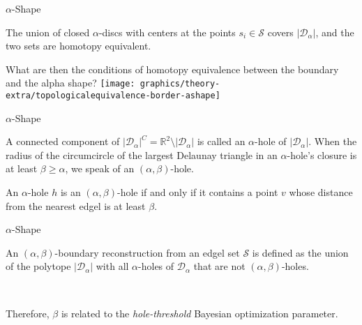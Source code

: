     \begin{frame}{$\alpha$-Shape}
         {
            \begin{lemma}
                The union of closed $\alpha$-discs with centers at the points $s_i \in \mathcal{S}$ covers $\lvert \mathcal{D}_\alpha \rvert$, and the two sets are homotopy equivalent.\newline
            \end{lemma}
        }
         {
            What are then the conditions of homotopy equivalence between the boundary and the alpha shape?
        }
         {
            \texttt{[image: graphics/theory-extra/topologicalequivalence-border-ashape]}
        }
    \end{frame}

    \begin{frame}{$\alpha$-Shape}
         {
            \begin{definition}
                A connected component of $\lvert\mathcal{D}_\alpha\rvert^C = \mathbb{R}^2 \setminus \lvert \mathcal{D}_\alpha \rvert$ is called an $\alpha$-hole of $\lvert\mathcal{D}_\alpha\rvert$. When the radius of the circumcircle of the largest Delaunay triangle in an $\alpha$-hole’s closure is at least $\beta \geq \alpha$, we speak of an $\left(\alpha, \beta\right)$-hole.
            \end{definition}
        }
         {
            \begin{lemma}
                An $\alpha$-hole $h$ is an $\left(\alpha,\beta\right)$-hole if and only if it contains a point $v$ whose distance from the nearest edgel is at least $\beta$.\newline
            \end{lemma}
        }
    \end{frame}

    \begin{frame}{$\alpha$-Shape}
         {
            \begin{definition}
                An $\left(\alpha,\beta\right)$-boundary reconstruction from an edgel set $\mathcal{S}$ is defined as the union of the polytope $\lvert\mathcal{D}_\alpha\rvert$ with all $\alpha$-holes of $\mathcal{D}_\alpha$ that are not $\left(\alpha,\beta\right)$-holes.
            \end{definition}
        }
         {
            \begin{remark}
                Therefore, $\beta$ is related to the \textit{hole-threshold} Bayesian optimization parameter.
            \end{remark}
        }
    \end{frame}


